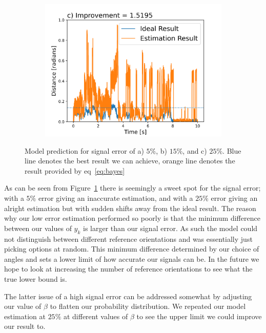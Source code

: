 \documentclass[final, 3p]{elsarticle}
\begin{document}
\begin{figure}[h]
\begin{subfigure}{0.5\textwidth}
		\includegraphics[width=\textwidth]{./Images/epsilon_25.png}
	\end{subfigure}
	\caption{Model prediction for signal error of a) $5\%$, b) $15\%$, and c) $25\%$. Blue line denotes the best result we can achieve, orange line denotes the result provided by eq~\ref{eq:bayes}}
	\label{fig:epsilon}
\end{figure}

As can be seen from Figure~\ref{fig:epsilon} there is seemingly a sweet spot for the signal error; with a $5\%$ error giving an inaccurate estimation, and with a $25\%$ error giving an alright estimation but with sudden shifts away from the ideal result. The reason why our low error estimation performed so poorly is that the minimum difference between our values of $y_k$ is larger than our signal error. As such the model could not distinguish between different reference orientations and was essentially just picking options at random. This minimum difference determined by our choice of angles and sets a lower limit of how accurate our signals can be.  In the future we hope to look at increasing the number of reference orientations to see what the true lower bound is.  

The latter issue of a high signal error can be addressed somewhat by adjusting our value of $\beta$ to flatten our probability distribution. We repeated our model estimation at $25\%$ at different values of $\beta$ to see the upper limit we could improve our result to.    
\end{document}
